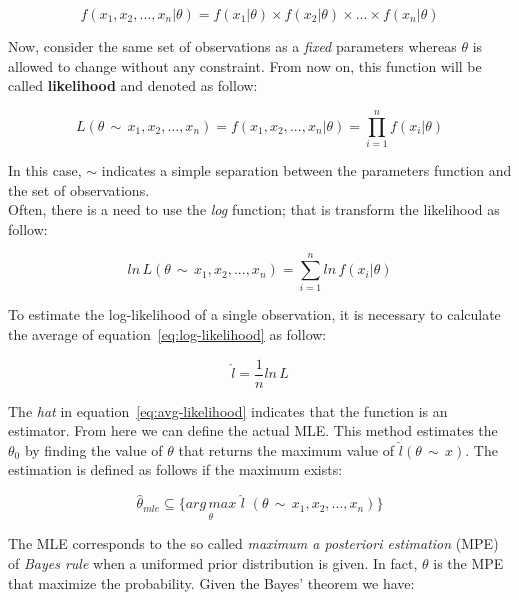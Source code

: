 \begin{equation}
	f (x_{1}, x_{2}, ... , x_{n} | \theta) = f(x_{1} | \theta) \times f(x_{2} | \theta) \times ... \times f(x_{n} | \theta)
\end{equation}

\noindent Now, consider the same set of observations as a \textit{fixed} parameters whereas $\theta$ is allowed to change without any constraint. From now on, this function will be called \textbf{likelihood} and denoted as follow:

\begin{equation}
	L(\theta \, \sim \, x_{1}, x_{2}, ... , x_{n}) = f (x_{1}, x_{2}, ... , x_{n} | \theta) = \prod_{i=1}^{n} f (x_{i} | \theta)
\end{equation}

\noindent In this case, $\sim$ indicates a simple separation between the parameters function and the set of observations. \\
\noindent Often, there is a need to use the \textit{log} function; that is transform the likelihood as follow:

\begin{equation}
\label{eq:log-likelihood}
	ln \, L(\theta \, \sim \, x_{1}, x_{2}, ... , x_{n}) = \sum_{i=1}^{n} ln \, f(x_{i} | \theta)
\end{equation}

\noindent To estimate the log-likelihood of a single observation, it is necessary to calculate the average of equation~\ref{eq:log-likelihood} as follow:

\begin{equation}
\label{eq:avg-likelihood}
	\hat{l} = \frac{1}{n} ln \, L
\end{equation}

\noindent The \textit{hat} in equation~\ref{eq:avg-likelihood} indicates that the function is an estimator. From here we can define the actual MLE.
This method estimates the $\theta_{0}$ by finding the value of $\theta$ that returns the maximum value of $\hat{l}(\theta \, \sim \, x)$. The estimation is defined as follows if the maximum exists:

\begin{equation}
	\hat{\theta}_{mle} \subseteq \{ \underset{\theta}{arg \, max} \,\, \hat{l} \,\, (\theta \, \sim \, x_{1}, x_{2}, ... , x_{n})\}
\end{equation}

\noindent The MLE corresponds to the so called \textit{maximum a posteriori estimation} (MPE) of \textit{Bayes rule} when a uniformed prior distribution is given. In fact, $\theta$ is the MPE that maximize the probability. Given the Bayes' theorem we have:

